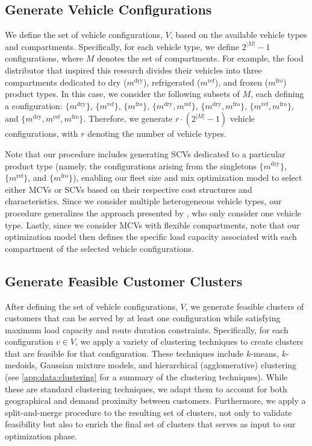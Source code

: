 \documentclass[11pt]{elsarticle}
\theoremstyle{plain}
\begin{document}
\subsection{Generate Vehicle Configurations} \label{sec:generate_configurations}

We define the set of vehicle configurations, $V$, based on the available vehicle types and compartments. Specifically, for each vehicle type, we define $2^{|M|}-1$ configurations, where $M$ denotes the set of compartments. For example, the food distributor that inspired this research divides their vehicles into three compartments dedicated to dry ($m^\text{dry}$), refrigerated ($m^\text{ref}$), and frozen ($m^\text{fro}$) product types. In this case, we consider the following subsets of $M$, each defining a configuration: $\{m^\text{dry}\}$, $\{m^\text{ref}\}$, $\{m^\text{fro}\}$, $\{m^\text{dry}, m^\text{ref}\}$, $\{m^\text{dry}, m^\text{fro}\}$, $\{m^\text{ref}, m^\text{fro}\}$, and $\{m^\text{dry}, m^\text{ref}, m^\text{fro}\}$. Therefore, we generate $r \cdot (2^{|M|}-1)$ vehicle configurations, with $r$ denoting the number of vehicle types.

Note that our procedure includes generating \acp{SCV} dedicated to a particular product type (namely, the configurations arising from the singletons $\{m^\text{dry}\}$, $\{m^\text{ref}\}$, and $\{m^\text{fro}\}$), enabling our fleet size and mix optimization model to select either \acp{MCV} or \acp{SCV} based on their respective cost structures and characteristics. Since we consider multiple heterogeneous vehicle types, our procedure generalizes the approach presented by \cite{OstermeierHübner2018}, who only consider one vehicle type. Lastly, since we consider \acp{MCV} with flexible compartments, note that our optimization model then defines the specific load capacity associated with each compartment of the selected vehicle configurations.


\subsection{Generate Feasible Customer Clusters}
\label{sec:generate_feasible_clusters}

After defining the set of vehicle configurations, $V$, we generate feasible clusters of customers that can be served by at least one configuration while satisfying maximum load capacity and route duration constraints. Specifically, for each configuration $v \in V$, we apply a variety of clustering techniques to create clusters that are feasible for that configuration. These techniques include $k$-means, $k$-medoids, Gaussian mixture models, and hierarchical (agglomerative) clustering (see \ref{app:data:clustering} for a summary of the clustering techniques). While these are standard clustering techniques, we adapt them to account for both geographical and demand proximity between customers. Furthermore, we apply a split-and-merge procedure to the resulting set of clusters, not only to validate feasibility but also to enrich the final set of clusters that serves as input to our optimization phase.
\end{document}
